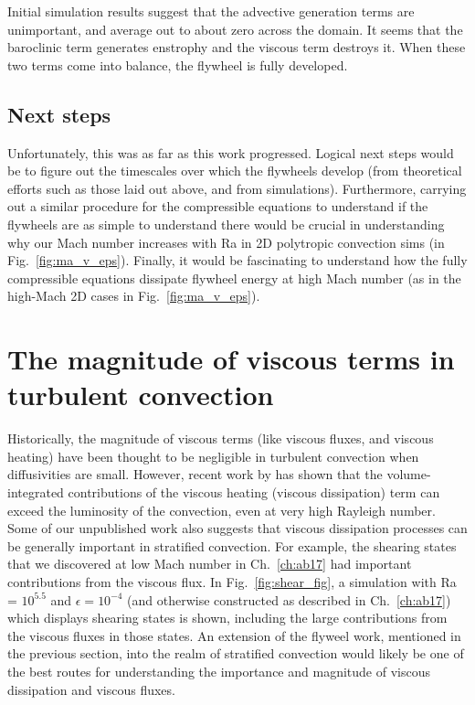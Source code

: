 Initial simulation results suggest that the advective generation terms are unimportant, and average out to about zero across the domain.
It seems that the baroclinic term generates enstrophy and the viscous term destroys it.
When these two terms come into balance, the flywheel is fully developed.

\subsection{Next steps}
Unfortunately, this was as far as this work progressed.
Logical next steps would be to figure out the timescales over which the flywheels develop (from theoretical efforts such as those laid out above, and from simulations).
Furthermore, carrying out a similar procedure for the compressible equations to understand if the flywheels are as simple to understand there would be crucial in understanding why our Mach number increases with Ra in 2D polytropic convection sims (in Fig.~\ref{fig:ma_v_eps}).
Finally, it would be fascinating to understand how the fully compressible equations dissipate flywheel energy at high Mach number (as in the high-Mach 2D cases in Fig.~\ref{fig:ma_v_eps}).

\section{The magnitude of viscous terms in turbulent convection}
Historically, the magnitude of viscous terms (like viscous fluxes, and viscous heating) have been thought to be negligible in turbulent convection when diffusivities are small.
However, recent work by \citet{currie&all2017} has shown that the volume-integrated contributions of the viscous heating (viscous dissipation) term can exceed the luminosity of the convection, even at very high Rayleigh number.
Some of our unpublished work also suggests that viscous dissipation processes can be generally important in stratified convection.
For example, the shearing states that we discovered at low Mach number in Ch.~\ref{ch:ab17} had important contributions from the viscous flux.
In Fig.~\ref{fig:shear_fig}, a simulation with Ra = $10^{5.5}$ and $\epsilon = 10^{-4}$ (and otherwise constructed as described in Ch.~\ref{ch:ab17}) which displays shearing states is shown, including the large contributions from the viscous fluxes in those states.
An extension of the flyweel work, mentioned in the previous section, into the realm of stratified convection would likely be one of the best routes for understanding the importance and magnitude of viscous dissipation and viscous fluxes.

